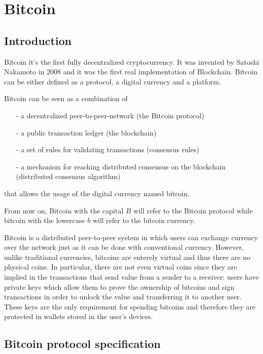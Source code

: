 \section{Bitcoin}\label{sec:Bitcoin}
\subsection{Introduction}

Bitcoin it's the first fully decentralized cryptocurrency. It was invented by
Satoshi Nakamoto in 2008 and it was the first real implementation of Blockchain.
Bitcoin can be either defined as a protocol, a digital currency and a platform.

Bitcoin can be seen as a combination of
\vspace{-\topsep}
\begin{itemize}
  \item[-] a decentralized peer-to-peer-network (the Bitcoin protocol)
  \item[-] a public transaction ledger (the blockchain)
  \item[-] a set of rules for validating transactions (consensus rules)
  \item[-] a mechanism for reaching distributed consensus on the blockchain (distributed
  consensus algorithm)
\end{itemize}
\vspace{-\topsep}
that allows the usage of the digital currency named bitcoin.

From now on, Bitcoin with the capital $B$ will refer to the Bitcoin protocol while bitcoin with the lowercase
$b$ will refer to the bitcoin currency.



Bitcoin is a distributed peer-to-peer system in which users can exchange
currency over the network just as it can be done with conventional currency.
However, unlike traditional currencies, bitcoins are enterely virtual and thus
there are no physical coins. In particular, there are not even virtual coins since
they are implied in the transactions that send value from a sender to a receiver:
users have private keys which allow them to prove the ownership of bitcoins and
sign transactions in order to unlock the value and transferring it to another user.
These keys are the only requirement for spending bitcoins and therefore they are
protected in wallets stored in the user's devices.
















\subsection{Bitcoin protocol specification}

